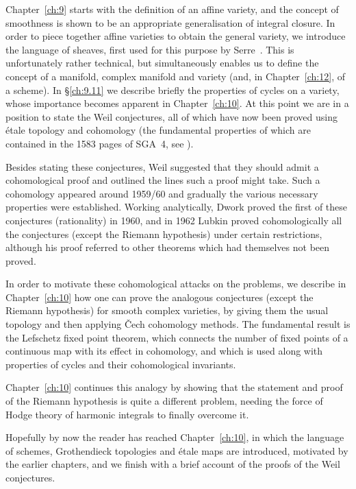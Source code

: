 \documentclass[10pt,leqno]{article}
\theoremstyle{definition}
\begin{document}
Chapter~\ref{ch:9} starts with the definition of an affine variety, and the concept of smoothness is shown to be an appropriate generalisation of integral closure.
In order to piece together affine varieties to obtain the general variety, we introduce the language of sheaves, first used for this purpose by Serre~\cite{bib:166}.
This is unfortunately rather technical, but simultaneously enables us to define the concept of a manifold, complex manifold and variety (and, in Chapter~\ref{ch:12}, of a scheme).
In \S\ref{ch:9.11} we describe briefly the properties of cycles on a variety, whose importance becomes apparent in Chapter~\ref{ch:10}.
At this point we are in a position to state the Weil conjectures, all of which have now been proved using \'etale topology and cohomology (the fundamental properties of which are contained in the 1583 pages of SGA~4, see \cite{bib:14}).

Besides stating these conjectures, Weil suggested that they should admit a cohomological proof and outlined the lines such a proof might take.
Such a cohomology appeared around 1959/60 and gradually the various necessary properties were established.
Working analytically, Dwork proved the first of these conjectures (rationality) in 1960, and in 1962 Lubkin proved cohomologically all the conjectures (except the Riemann hypothesis) under certain restrictions, although his proof referred to other theorems which had themselves not been proved.

In order to motivate these cohomological attacks on the problems, we describe in Chapter~\ref{ch:10} how one can prove the analogous conjectures (except the Riemann hypothesis) for smooth complex varieties, by giving them the usual topology and then applying \v{C}ech cohomology methods.
The fundamental result is the Lefschetz fixed point theorem, which connects the number of fixed points of a continuous map with its effect in cohomology, and which is used along with properties of cycles and their cohomological invariants.

Chapter~\ref{ch:10} continues this analogy by showing that the statement and proof of the Riemann hypothesis is quite a different problem, needing the force of Hodge theory of harmonic integrals to finally overcome it.

Hopefully by now the reader has reached Chapter~\ref{ch:10}, in which the language of schemes, Grothendieck topologies and \'etale maps are introduced, motivated by the earlier chapters, and we finish with a brief account of the proofs of the Weil conjectures.
\end{document}
